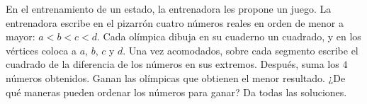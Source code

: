 En el entrenamiento de un estado, la entrenadora les propone un juego. La entrenadora escribe en el pizarrón cuatro números reales en orden de menor a mayor: $a\lt b\lt c\lt d$. Cada olímpica dibuja en su cuaderno un cuadrado, y en los vértices coloca a $a$, $b$, $c$ y $d$. Una vez acomodados, sobre cada segmento escribe el cuadrado de la diferencia de los números en sus extremos. Después, suma los $4$ números obtenidos. Ganan las olímpicas que obtienen el menor resultado. ¿De qué maneras pueden ordenar los números para ganar? Da todas las soluciones.